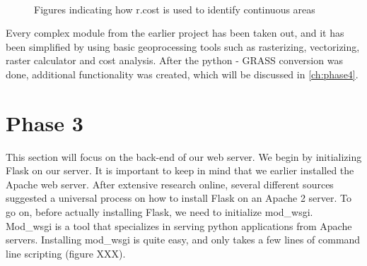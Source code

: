 \begin{figure}[h!]
  \myfloatalign
   \quad
   \\
 \caption{Figures indicating how r.cost is used to identify continuous areas}
 \label{fig:continuous}
\end{figure}

Every complex module from the earlier project has been taken out, and it has been simplified by using basic geoprocessing tools such as rasterizing, vectorizing, raster calculator and cost analysis. After the python - GRASS conversion was done, additional functionality was created, which will be discussed in \autoref{ch:phase4}.

\section{Phase 3}
This section will focus on the back-end of our web server. We begin by initializing Flask on our server. It is important to keep in mind that we earlier installed the Apache web server. After extensive research online, several different sources suggested a universal process on how to install Flask on an Apache 2 server. To go on, before actually installing Flask, we need to initialize mod\_wsgi. Mod\_wsgi is a tool that specializes in serving python applications from Apache servers. Installing mod\_wsgi is quite easy, and only takes a few lines of command line scripting (figure XXX).\\

